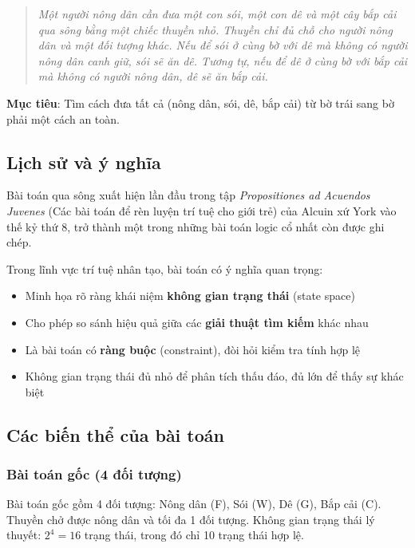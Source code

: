 \documentclass[a4paper,12pt]{article}
\begin{document}
\begin{quote}
\textit{Một người nông dân cần đưa một con sói, một con dê và một cây bắp cải qua sông bằng một chiếc thuyền nhỏ. Thuyền chỉ đủ chỗ cho người nông dân và một đối tượng khác. Nếu để sói ở cùng bờ với dê mà không có người nông dân canh giữ, sói sẽ ăn dê. Tương tự, nếu để dê ở cùng bờ với bắp cải mà không có người nông dân, dê sẽ ăn bắp cải.}
\end{quote}

\textbf{Mục tiêu}: Tìm cách đưa tất cả (nông dân, sói, dê, bắp cải) từ bờ trái sang bờ phải một cách an toàn.

\subsection{Lịch sử và ý nghĩa}

Bài toán qua sông xuất hiện lần đầu trong tập \textit{Propositiones ad Acuendos Juvenes} (Các bài toán để rèn luyện trí tuệ cho giới trẻ) của Alcuin xứ York vào thế kỷ thứ 8, trở thành một trong những bài toán logic cổ nhất còn được ghi chép.

Trong lĩnh vực trí tuệ nhân tạo, bài toán có ý nghĩa quan trọng:
\begin{itemize}
    \item Minh họa rõ ràng khái niệm \textbf{không gian trạng thái} (state space)
    \item Cho phép so sánh hiệu quả giữa các \textbf{giải thuật tìm kiếm} khác nhau
    \item Là bài toán có \textbf{ràng buộc} (constraint), đòi hỏi kiểm tra tính hợp lệ
    \item Không gian trạng thái đủ nhỏ để phân tích thấu đáo, đủ lớn để thấy sự khác biệt

\end{itemize}

\subsection{Các biến thể của bài toán}

\subsubsection{Bài toán gốc (4 đối tượng)}

Bài toán gốc gồm 4 đối tượng: Nông dân (F), Sói (W), Dê (G), Bắp cải (C). Thuyền chở được nông dân và tối đa 1 đối tượng. Không gian trạng thái lý thuyết: $2^4 = 16$ trạng thái, trong đó chỉ 10 trạng thái hợp lệ.
\end{document}
